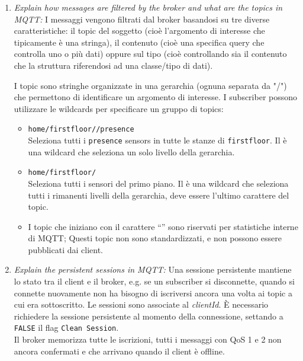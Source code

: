 \begin{enumerate}
\item \textit{Explain how messages are filtered by the broker and what are the topics in MQTT:} I messaggi vengono filtrati dal broker basandosi su tre diverse caratteristiche: il topic del soggetto (cioè l'argomento di interesse che tipicamente è una stringa), il contenuto (cioè una specifica query che controlla uno o più dati) oppure sul tipo (cioè controllando sia il contenuto che la struttura riferendosi ad una classe/tipo di dati). 

I topic sono stringhe organizzate in una gerarchia (ognuna separata da "/") che permettono di identificare un argomento di interesse. 
I subscriber possono utilizzare le wildcards per specificare un gruppo di topics:
\begin{itemize}
   \item \texttt{home/firstfloor/\textred{+}/presence}\\
   Seleziona tutti i \texttt{presence} sensors in tutte le stanze di \texttt{firstfloor}.
   Il \textred{+} è una wildcard che seleziona un solo livello della gerarchia.
   \item \texttt{home/firstfloor/\textred{\#}}\\
   Seleziona tutti i sensori del primo piano.
   Il \textred{\#} è una wildcard che seleziona tutti i rimanenti livelli della gerarchia, deve essere l'ultimo carattere del topic.
   \item I topic che iniziano con il carattere ``\texttt{\textred{\$}}'' sono riservati per statistiche interne di MQTT;
   Questi topic non sono standardizzati, e non possono essere pubblicati dai client.
\end{itemize}



\item \textit{Explain the persistent sessions in MQTT:} Una sessione persistente mantiene lo stato tra il client e il broker, e.g. se un subscriber si disconnette, quando si connette nuovamente non ha bisogno di iscriversi ancora una volta ai topic a cui era sottoscritto. Le sessioni sono associate al \emph{clientId}. 
È necessario richiedere la sessione persistente al momento della connessione, settando a \texttt{FALSE} il flag \texttt{Clean Session}.\\
Il broker memorizza tutte le iscrizioni, tutti i messaggi con QoS 1 e 2 non ancora confermati e che arrivano quando il client è offline.


\end{enumerate}
